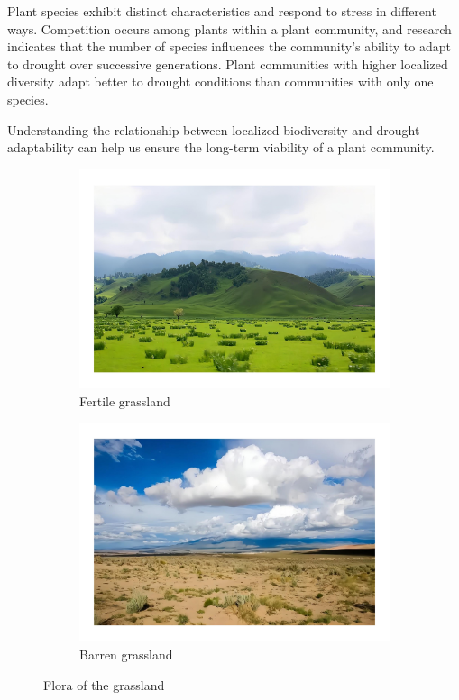 \documentclass{mcmthesis}
\begin{document}
Plant species exhibit distinct characteristics and respond to stress in different ways. Competition occurs among plants within a plant community, and research indicates that the number of species influences the community's ability to adapt to drought over successive generations. Plant communities with higher localized diversity adapt better to drought conditions than communities with only one species.

Understanding the relationship between localized biodiversity and drought adaptability can help us ensure the long-term viability of a plant community.

\begin{figure}[htbp]
\centering
\begin{subfigure}[t]{0.48\textwidth}
\centering
\includegraphics[width=1.05\textwidth]{./img/Fertile grassland.jpg}
\caption{Fertile grassland}
\end{subfigure}
\hfill
\begin{subfigure}[t]{0.48\textwidth}
\centering
\includegraphics[width=1.05\textwidth]{./img/Barren grassland.jpg}
\caption{Barren grassland}
\end{subfigure}
\caption{Flora of the grassland \cite{1}}
\label{fig:grassland}
\end{figure}
\end{document}
